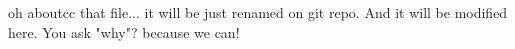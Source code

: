 oh
aboutcc that file...
it will be just renamed on git repo.
And it will be modified here.
You ask "why"?
because we can!
